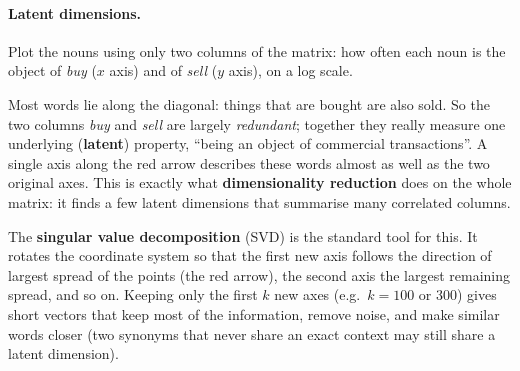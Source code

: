 \paragraph{Latent dimensions.}
Plot the nouns using only two columns of the matrix: how often each noun is the object
of \emph{buy} ($x$ axis) and of \emph{sell} ($y$ axis), on a log scale.

\begin{center}
\end{center}

Most words lie along the diagonal: things that are bought are also sold. So the two
columns \emph{buy} and \emph{sell} are largely \emph{redundant}; together they really
measure one underlying (\textbf{latent}) property, ``being an object of commercial
transactions''. A single axis along the red arrow describes these words almost as well
as the two original axes. This is exactly what \textbf{dimensionality reduction} does on
the whole matrix: it finds a few latent dimensions that summarise many correlated
columns.

\begin{nbintuition}
The \textbf{singular value decomposition} (SVD) is the standard tool for this. It rotates
the coordinate system so that the first new axis follows the direction of largest
spread of the points (the red arrow), the second axis the largest remaining spread, and
so on. Keeping only the first $k$ new axes (e.g.\ $k = 100$ or 300) gives short vectors
that keep most of the information, remove noise, and make similar words closer (two
synonyms that never share an exact context may still share a latent dimension).
\end{nbintuition}

